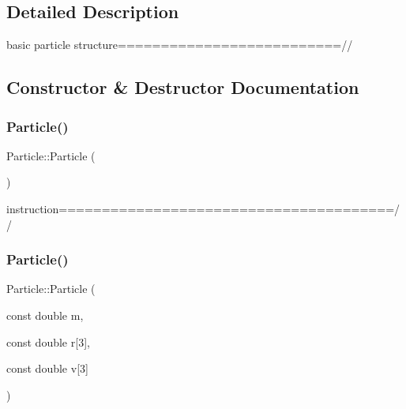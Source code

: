 \subsection{Detailed Description}
basic particle structure==========================// 

\subsection{Constructor \& Destructor Documentation}
\hypertarget{classParticle_a40f4c7e248029d72e7714b7802d5e5e1}{}\label{classParticle_a40f4c7e248029d72e7714b7802d5e5e1} 
\subsubsection{\texorpdfstring{Particle()}{Particle()}\hspace{0.1cm}{\footnotesize\ttfamily [1/4]}}
{\footnotesize\ttfamily Particle\+::\+Particle (\begin{DoxyParamCaption}{ }\end{DoxyParamCaption})\hspace{0.3cm}{\ttfamily [inline]}}



instruction=======================================// 

\hypertarget{classParticle_a5200252c69608a5cd6bd7be6ff03ae6c}{}\label{classParticle_a5200252c69608a5cd6bd7be6ff03ae6c} 
\subsubsection{\texorpdfstring{Particle()}{Particle()}\hspace{0.1cm}{\footnotesize\ttfamily [2/4]}}
{\footnotesize\ttfamily Particle\+::\+Particle (\begin{DoxyParamCaption}\item[{const double}]{m,  }\item[{const double}]{r\mbox{[}3\mbox{]},  }\item[{const double}]{v\mbox{[}3\mbox{]} }\end{DoxyParamCaption})\hspace{0.3cm}{\ttfamily [inline]}}

\hypertarget{classParticle_ac189ad370eb0a2c05869249d672a4f06}{}\label{classParticle_ac189ad370eb0a2c05869249d672a4f06} 
